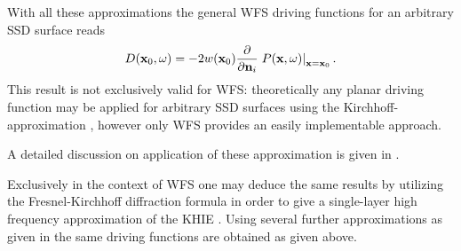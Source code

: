 With all these approximations the general WFS driving functions for an arbitrary SSD surface reads
\begin{equation}
D(\mathbf{x}_0,\omega) = -2 w(\mathbf{x}_0) \frac{\partial}{\partial \mathbf{n}_i} \left. P(\mathbf{x},\omega) \right|_{\mathbf{x} = \mathbf{x}_0}.
\end{equation}
This result is not exclusively valid for WFS: theoretically any planar driving function may be applied for arbitrary SSD surfaces using the Kirchhoff-approximation \cite{Ahrens2012}, however only WFS provides an easily implementable approach.

A detailed discussion on application of these approximation is given in \cite[Sec. 3.8]{Ahrens2012}.

Exclusively in the context of WFS one may deduce the same results by utilizing the Fresnel-Kirchhoff diffraction formula in order to give a single-layer high frequency approximation of the KHIE \cite[p. 215.]{Pierce1991}. Using several further approximations as given in \cite{Zotter2013:uniqueness} the same driving functions are obtained as given above.
%
%
%
%
